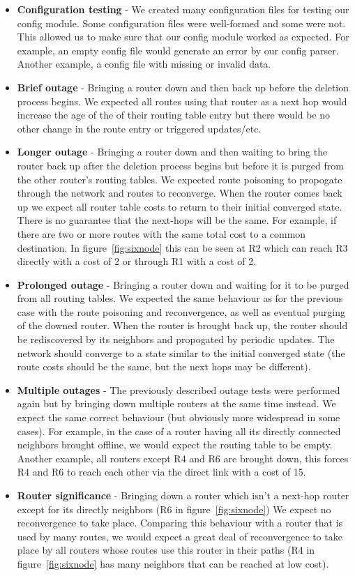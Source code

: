 \documentclass[11pt]{article} %
\begin{document}
\begin{itemize}
\item \textbf{Configuration testing} - We created many configuration files for testing our config module. Some configuration files were well-formed and some were not. This allowed us to make sure that our config module worked as expected. For example, an empty config file would generate an error by our config parser. Another example, a config file with missing or invalid data.
\item \textbf{Brief outage} - Bringing a router down and then back up before the deletion process begins. We expected all routes using that router as a next hop would increase the age of the of their routing table entry but there would be no other change in the route entry or triggered updates/etc.
\item \textbf{Longer outage} - Bringing a router down and then waiting to bring the router back up after the deletion process begins but before it is purged from the other router's routing tables. We expected route poisoning to propogate through the network and routes to reconverge. When the router comes back up we expect all router table costs to return to their initial converged state. There is no guarantee that the next-hops will be the same. For example, if there are two or more routes with the same total cost to a common destination. In figure\ \ref{fig:sixnode} this can be seen at R2 which can reach R3 directly with a cost of 2 or through R1 with a cost of 2.
\item \textbf{Prolonged outage} - Bringing a router down and waiting for it to be purged from all routing tables. We expected the same behaviour as for the previous case with the route poisoning and reconvergence, as well as eventual purging of the downed router. When the router is brought back up, the router should be rediscovered by its neighbors and propogated by periodic updates. The network should converge to a state similar to the initial converged state (the route costs should be the same, but the next hops may be different).
\item \textbf{Multiple outages} - The previously described outage tests were performed again but by bringing down multiple routers at the same time instead. We expect the same correct behaviour (but obviously more widespread in some cases). For example, in the case of a router having all its directly connected neighbors brought offline, we would expect the routing table to be empty. Another example, all routers except R4 and R6 are brought down, this forces R4 and R6 to reach each other via the direct link with a cost of 15.
\item \textbf{Router significance} - Bringing down a router which isn't a next-hop router except for its directly neighbors (R6 in figure\ \ref{fig:sixnode}) We expect no reconvergence to take place. Comparing this behaviour with a router that is used by many routes, we would expect a great deal of reconvergence to take place by all routers whose routes use this router in their paths (R4 in figure\ \ref{fig:sixnode} has many neighbors that can be reached at low cost).
\end{itemize}
\end{document}
